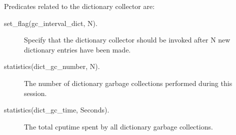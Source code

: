 \noindent Predicates related to the dictionary collector are:
\begin{description}
\item [set\_flag(gc\_interval\_dict, N).]
	Specify that the dictionary collector should be invoked after
	N new dictionary entries have been made.
\item [statistics(dict\_gc\_number, N).]
    The number of dictionary garbage collections performed during this {\eclipse} session.
\item [statistics(dict\_gc\_time, Seconds).]
    The total cputime spent by all dictionary garbage collections.
\end{description}

